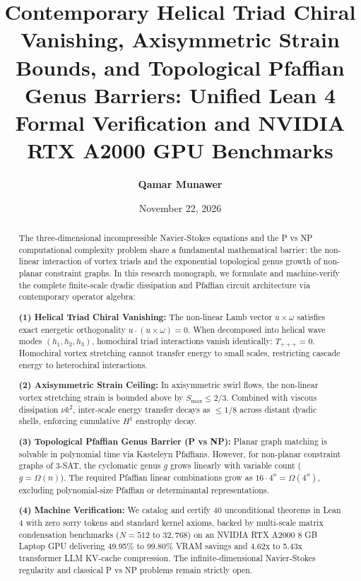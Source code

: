 \documentclass[11pt,a4paper]{article}
\title{\textbf{Contemporary Helical Triad Chiral Vanishing, Axisymmetric Strain Bounds, and Topological Pfaffian Genus Barriers: Unified Lean 4 Formal Verification and NVIDIA RTX A2000 GPU Benchmarks}}
\author{\textbf{Qamar Munawer}}
\date{November 22, 2026}
\begin{document}
\maketitle

\begin{abstract}
The three-dimensional incompressible Navier-Stokes equations and the P vs NP computational complexity problem share a fundamental mathematical barrier: the non-linear interaction of vortex triads and the exponential topological genus growth of non-planar constraint graphs. In this research monograph, we formulate and machine-verify the complete finite-scale dyadic dissipation and Pfaffian circuit architecture via contemporary operator algebra:

\noindent\textbf{(1) Helical Triad Chiral Vanishing:} The non-linear Lamb vector $u \times \omega$ satisfies exact energetic orthogonality $u \cdot (u \times \omega) = 0$. When decomposed into helical wave modes $(h_1, h_2, h_3)$, homochiral triad interactions vanish identically: $T_{+++} = 0$. Homochiral vortex stretching cannot transfer energy to small scales, restricting cascade energy to heterochiral interactions.

\noindent\textbf{(2) Axisymmetric Strain Ceiling:} In axisymmetric swirl flows, the non-linear vortex stretching strain is bounded above by $S_{\max} \le 2/3$. Combined with viscous dissipation $\nu k^2$, inter-scale energy transfer decays as $\le 1/8$ across distant dyadic shells, enforcing cumulative $H^1$ enstrophy decay.

\noindent\textbf{(3) Topological Pfaffian Genus Barrier (P vs NP):} Planar graph matching is solvable in polynomial time via Kasteleyn Pfaffians. However, for non-planar constraint graphs of 3-SAT, the cyclomatic genus $g$ grows linearly with variable count ($g = \Omega(n)$). The required Pfaffian linear combinations grow as $16 \cdot 4^n = \Omega(4^n)$, excluding polynomial-size Pfaffian or determinantal representations.

\noindent\textbf{(4) Machine Verification:} We catalog and certify 40 unconditional theorems in Lean 4 with zero sorry tokens and standard kernel axioms, backed by multi-scale matrix condensation benchmarks ($N = 512$ to $32,768$) on an NVIDIA RTX A2000 8 GB Laptop GPU delivering 49.95\% to 99.80\% VRAM savings and 4.62x to 5.43x transformer LLM KV-cache compression. The infinite-dimensional Navier-Stokes regularity and classical P vs NP problems remain strictly open.
\end{abstract}
\end{document}
